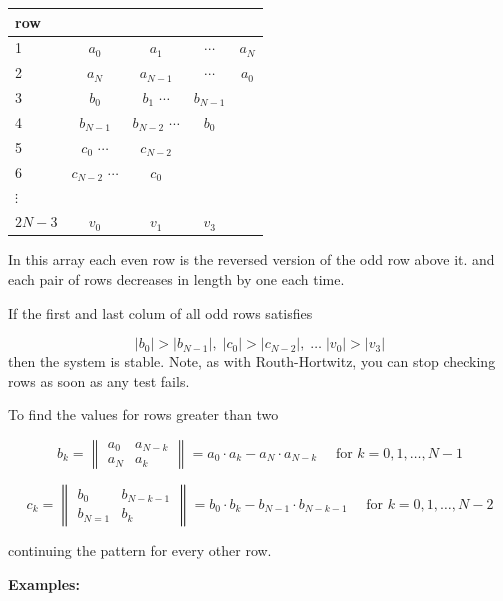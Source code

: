 \documentclass{article}
\begin{document}
\begin{center}
  \begin{tabular}{l|cccc}
    \mbox{row} & & & & \\
    \hline
    1 & $a_0$ & $a_1$ & $\cdots$ & $a_N$\\
    2 & $a_N$ & $a_{N-1}$ & $\cdots$ & $a_0$\\
    3 & $b_0$ & $b_1$ $\cdots$ & $b_{N-1}$ &\\
    4 & $b_{N-1}$ & $b_{N-2}$ $\cdots$ & $b_0$ &\\
    5 & $c_0$ $\cdots$ & $c_{N-2}$ & & &\\
    6 & $c_{N-2}$ $\cdots$ & $c_0$ & & &\\
    $\vdots$ & & & & &\\
    $2N-3$ & $v_0$ & $v_1$ & $v_3$ & &
\end{tabular}
\end{center}

In this array each even row is the reversed version of the odd row above it. and each pair of rows decreases in length by one each time.

If the first and last colum of all odd rows satisfies

\[
|b_0| > |b_{N-1}|, \; |c_0| > |c_{N-2}|, \; \ldots\; |v_0| > |v_{3}| 
\]
then the system is stable. Note, as with Routh-Hortwitz, you can stop checking rows as soon as any test fails.

To find the values for rows greater than two

\[
b_k = \left\lVert \begin{array}{cc}
  a_0 & a_{N-k}\\
  a_N & a_k
\end{array}\right\rVert = a_0\cdot a_k - a_N\cdot a_{N-k} \quad\mbox{ for } k = 0,1,\ldots, N-1  
\]

\[
c_k = \left\lVert \begin{array}{cc}
  b_0 & b_{N-k-1}\\
  b_{N=1} & b_k
\end{array}\right\rVert = b_0\cdot b_k - b_{N-1}\cdot b_{N-k-1} \quad\mbox{ for } k = 0,1,\ldots, N-2
\]

continuing the pattern for every other row.

\textbf{Examples:}
\end{document}
